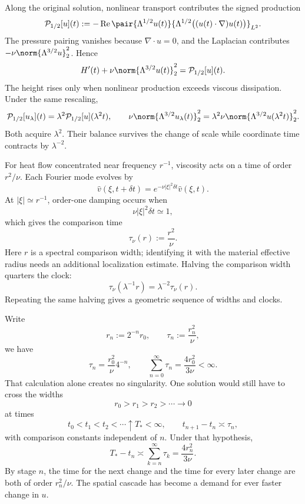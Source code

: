 Along the original solution, nonlinear transport contributes the signed production
\[
  \mathcal P_{1/2}[u](t)
  :=
  -\operatorname{Re}
  \pair
    {\Lambda^{1/2}u(t)}
    {\Lambda^{1/2}\bigl((u(t)\cdot\nabla)u(t)\bigr)}_{L^2}.
\]
The pressure pairing vanishes because \(\nabla\cdot u=0\), and the Laplacian contributes \(-\nu\norm{\Lambda^{3/2}u}_2^2\). Hence
\[
  H'(t)
  +
  \nu\norm{\Lambda^{3/2}u(t)}_2^2
  =
  \mathcal P_{1/2}[u](t).
\]
The height rises only when nonlinear production exceeds viscous dissipation. Under the same rescaling,
\[
  \mathcal P_{1/2}[u_\lambda](t)
  =
  \lambda^2\mathcal P_{1/2}[u](\lambda^2t),
  \qquad
  \nu\norm{\Lambda^{3/2}u_\lambda(t)}_2^2
  =
  \lambda^2\nu\norm{\Lambda^{3/2}u(\lambda^2t)}_2^2.
\]
Both acquire \(\lambda^2\). Their balance survives the change of scale while coordinate time contracts by \(\lambda^{-2}\).


For heat flow concentrated near frequency \(r^{-1}\), viscosity acts on a time of order \(r^2/\nu\). Each Fourier mode evolves by
\[
  \widehat v(\xi,t+\delta t)
  =
  e^{-\nu|\xi|^2\delta t}\widehat v(\xi,t).
\]
At \(|\xi|\simeq r^{-1}\), order-one damping occurs when
\[
  \nu|\xi|^2\delta t\simeq1,
\]
which gives the comparison time
\[
  \tau_\nu(r)
  :=
  \frac{r^2}{\nu}.
\]
Here \(r\) is a spectral comparison width; identifying it with the material effective radius needs an additional localization estimate. Halving the comparison width quarters the clock:
\[
  \tau_\nu(\lambda^{-1}r)
  =
  \lambda^{-2}\tau_\nu(r).
\]
Repeating the same halving gives a geometric sequence of widths and clocks.


Write
\[
  r_n:=2^{-n}r_0,
  \qquad
  \tau_n:=\frac{r_n^2}{\nu},
\]
we have
\[
  \tau_n
  =
  \frac{r_0^2}{\nu}4^{-n},
  \qquad
  \sum_{n=0}^{\infty}\tau_n
  =
  \frac{4r_0^2}{3\nu}
  <
  \infty.
\]
That calculation alone creates no singularity. One \NavierStokes{} solution would still have to cross the widths
\[
  r_0>r_1>r_2>\cdots\longrightarrow0
\]
at times
\[
  t_0<t_1<t_2<\cdots\uparrow T_*<\infty,
  \qquad
  t_{n+1}-t_n\asymp\tau_n,
\]
with comparison constants independent of \(n\). Under that hypothesis,
\[
  T_*-t_n
  \asymp
  \sum_{k=n}^{\infty}\tau_k
  =
  \frac{4r_n^2}{3\nu}.
\]
By stage \(n\), the time for the next change and the time for every later change are both of order \(r_n^2/\nu\). The spatial cascade has become a demand for ever faster change in \(u\).
